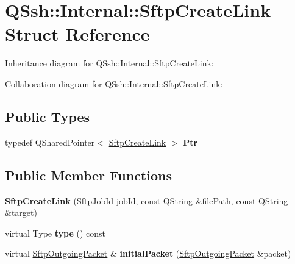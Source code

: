 \hypertarget{struct_q_ssh_1_1_internal_1_1_sftp_create_link}{}\section{Q\+Ssh\+:\+:Internal\+:\+:Sftp\+Create\+Link Struct Reference}
\label{struct_q_ssh_1_1_internal_1_1_sftp_create_link}


Inheritance diagram for Q\+Ssh\+:\+:Internal\+:\+:Sftp\+Create\+Link\+:


Collaboration diagram for Q\+Ssh\+:\+:Internal\+:\+:Sftp\+Create\+Link\+:
\subsection*{Public Types}
\begin{DoxyCompactItemize}
\item 
\mbox{\label{struct_q_ssh_1_1_internal_1_1_sftp_create_link_af37c55ac6f427a70a2b12ef135561f92}} 
typedef Q\+Shared\+Pointer$<$ \mbox{\hyperlink{struct_q_ssh_1_1_internal_1_1_sftp_create_link}{Sftp\+Create\+Link}} $>$ {\bfseries Ptr}
\end{DoxyCompactItemize}
\subsection*{Public Member Functions}
\begin{DoxyCompactItemize}
\item 
\mbox{\label{struct_q_ssh_1_1_internal_1_1_sftp_create_link_a5046c0d4672cc9166367a552a0cc41a8}} 
{\bfseries Sftp\+Create\+Link} (Sftp\+Job\+Id job\+Id, const Q\+String \&file\+Path, const Q\+String \&target)
\item 
\mbox{\label{struct_q_ssh_1_1_internal_1_1_sftp_create_link_a92bcf2744619a3038da72b84372e35cf}} 
virtual Type {\bfseries type} () const
\item 
\mbox{\label{struct_q_ssh_1_1_internal_1_1_sftp_create_link_afb00bbd71f7d6f6ab3c5cf8c1b08e1d2}} 
virtual \mbox{\hyperlink{class_q_ssh_1_1_internal_1_1_sftp_outgoing_packet}{Sftp\+Outgoing\+Packet}} \& {\bfseries initial\+Packet} (\mbox{\hyperlink{class_q_ssh_1_1_internal_1_1_sftp_outgoing_packet}{Sftp\+Outgoing\+Packet}} \&packet)
\end{DoxyCompactItemize}
